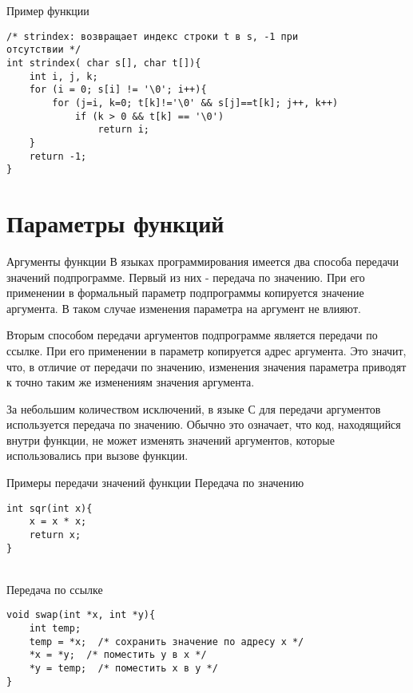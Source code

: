 \documentclass{beamer}
\begin{document}
\begin{frame}[fragile]{Пример функции}
\begin{verbatim}
/* strindex: возвращает индекс строки t в s, -1 при 
отсутствии */
int strindex( char s[], char t[]){
    int i, j, k;
    for (i = 0; s[i] != '\0'; i++){
        for (j=i, k=0; t[k]!='\0' && s[j]==t[k]; j++, k++)
            if (k > 0 && t[k] == '\0')
                return i;
    }
    return -1;
}
\end{verbatim}
\end{frame}

\section{Параметры функций}

\begin{frame}{Аргументы функции}
    В языках программирования имеется два способа передачи значений подпрограмме. Первый из них - передача по значению. При его применении в формальный параметр подпрограммы копируется значение аргумента. В таком случае изменения параметра на аргумент не влияют.
    
    Вторым способом передачи аргументов подпрограмме является передачи по ссылке. При его применении в параметр копируется адрес аргумента. Это значит, что, в отличие от передачи по значению, изменения значения параметра приводят к точно таким же изменениям значения аргумента.
    
    За небольшим количеством исключений, в языке С для передачи аргументов используется передача по значению. Обычно это означает, что код, находящийся внутри функции, не может изменять значений аргументов, которые использовались при вызове функции.
\end{frame}

\begin{frame}[fragile]{Примеры передачи значений функции}
Передача по значению
\begin{verbatim}
int sqr(int x){
    x = x * x;
    return x;
}
\end{verbatim}

\\
Передача по ссылке
\begin{verbatim}
void swap(int *x, int *y){
    int temp;
    temp = *x;  /* сохранить значение по адресу x */
    *x = *y;  /* поместить y в x */
    *y = temp;  /* поместить x в y */
}
\end{verbatim}
\end{frame}
\end{document}
